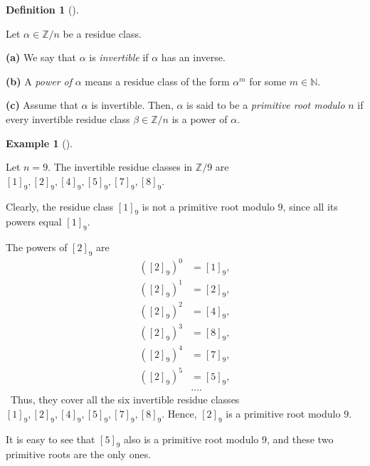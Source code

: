 \documentclass[numbers=enddot,12pt,final,onecolumn,notitlepage]{scrartcl}%
\numberwithin{exer}{subsection}
\theoremstyle{definition}
\newtheorem{defi}[theo]{Definition}
\newenvironment{definition}[1][]
{\begin{defi}[#1]\begin{leftbar}}
{\end{leftbar}\end{defi}}
\newtheorem{exam}[theo]{Example}
\newenvironment{example}[1][]
{\begin{exam}[#1]\begin{leftbar}}
{\end{leftbar}\end{exam}}
\begin{document}
\begin{definition}
\label{def.eqrel.primroot1.def.primroot}Let $\alpha\in\mathbb{Z}/n$ be a
residue class.

\textbf{(a)} We say that $\alpha$ is \textit{invertible} if $\alpha$ has an inverse.

\textbf{(b)} A \textit{power of }$\alpha$ means a residue class of the form
$\alpha^{m}$ for some $m\in\mathbb{N}$.

\textbf{(c)} Assume that $\alpha$ is invertible. Then, $\alpha$ is said to be
a \textit{primitive root modulo }$n$ if every invertible residue class
$\beta\in\mathbb{Z}/n$ is a power of $\alpha$.
\end{definition}

\begin{example}
\label{exa.eqrel.primroot1.def.primroot9}Let $n=9$. The invertible residue
classes in $\mathbb{Z}/9$ are $\left[  1\right]  _{9},\left[  2\right]
_{9},\left[  4\right]  _{9},\left[  5\right]  _{9},\left[  7\right]
_{9},\left[  8\right]  _{9}$.

Clearly, the residue class $\left[  1\right]  _{9}$ is not a primitive root
modulo $9$, since all its powers equal $\left[  1\right]  _{9}$.

The powers of $\left[  2\right]  _{9}$ are
\begin{align*}
\left(  \left[  2\right]  _{9}\right)  ^{0}  &  =\left[  1\right]  _{9},\\
\left(  \left[  2\right]  _{9}\right)  ^{1}  &  =\left[  2\right]  _{9},\\
\left(  \left[  2\right]  _{9}\right)  ^{2}  &  =\left[  4\right]  _{9},\\
\left(  \left[  2\right]  _{9}\right)  ^{3}  &  =\left[  8\right]  _{9},\\
\left(  \left[  2\right]  _{9}\right)  ^{4}  &  =\left[  7\right]  _{9},\\
\left(  \left[  2\right]  _{9}\right)  ^{5}  &  =\left[  5\right]  _{9},\\
&  \ldots.
\end{align*}
\footnotemark\ Thus, they cover all the six invertible residue classes
$\left[  1\right]  _{9},\left[  2\right]  _{9},\left[  4\right]  _{9},\left[
5\right]  _{9},\left[  7\right]  _{9},\left[  8\right]  _{9}$. Hence, $\left[
2\right]  _{9}$ is a primitive root modulo $9$.

It is easy to see that $\left[  5\right]  _{9}$ also is a primitive root
modulo $9$, and these two primitive roots are the only ones.
\end{example}
\end{document}
